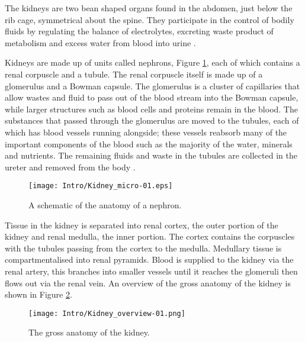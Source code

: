 The kidneys are two bean shaped organs found in the abdomen, just below the rib cage, symmetrical about the spine. They participate in the control of bodily fluids by regulating the balance of electrolytes, excreting waste product of metabolism and excess water from blood into urine \cite{lote_principles_2012}. 

Kidneys are made up of units called nephrons, Figure \ref{fig:intro_nephron}, each of which contains a renal corpuscle and a tubule. The renal corpuscle itself is made up of a glomerulus and a Bowman capsule. The glomerulus is a cluster of capillaries that allow wastes and fluid to pass out of the blood stream into the Bowman capsule, while larger structures such as blood cells and proteins remain in the blood. The substances that passed through the glomerulus are moved to the tubules, each of which has blood vessels running alongside; these vessels reabsorb many of the important components of the blood such as the majority of the water, minerals and nutrients. The remaining fluids and waste in the tubules are collected in the ureter and removed from the body \cite{hall_guyton_2015}. 

\begin{figure}[H]
	\centering
	\texttt{[image: Intro/Kidney\_micro-01.eps]}
	\caption{A schematic of the anatomy of a nephron.}
	\label{fig:intro_nephron}	
\end{figure}

Tissue in the kidney is separated into renal cortex, the outer portion of the kidney and renal medulla, the inner portion. The cortex contains the corpuscles with the tubules passing from the cortex to the medulla. Medullary tissue is compartmentalised into renal pyramids. Blood is supplied to the kidney via the renal artery, this branches into smaller vessels until it reaches the glomeruli then flows out via the renal vein. An overview of the gross anatomy of the kidney is shown in Figure \ref{fig:intro_kidney_overview}.

\begin{figure}[H]
	\centering
	\texttt{[image: Intro/Kidney\_overview-01.png]}
	\caption{The gross anatomy of the kidney.}
	\label{fig:intro_kidney_overview}	
\end{figure}

